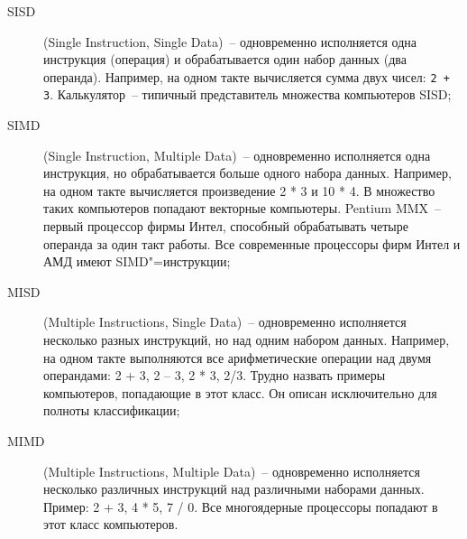 \documentclass[14pt, a4paper, openany, twoside, draft]{extbook} %
\begin{document}
\begin{description}
\item [SISD] (Single Instruction, Single Data)~-- одновременно исполняется одна инструкция (операция) и обрабатывается один набор данных (два операнда). Например, на одном такте вычисляется сумма двух чисел: \texttt{2 + 3}. Калькулятор~-- типичный представитель множества компьютеров SISD;
\item [SIMD] (Single Instruction, Multiple Data)~-- одновременно исполняется одна инструкция, но обрабатывается больше одного набора данных. Например, на одном такте вычисляется произведение 2 * 3 и 10 * 4. В множество таких компьютеров попадают векторные компьютеры. Pentium MMX~-- первый процессор фирмы Интел, способный обрабатывать четыре операнда за один такт работы. Все современные процессоры фирм Интел и АМД имеют SIMD"=инструкции;
\item [MISD] (Multiple Instructions, Single Data)~-- одновременно исполняется несколько разных инструкций, но над одним набором данных. Например, на одном такте выполняются все арифметические операции над двумя операндами: 2 + 3, 2 – 3, 2 * 3, 2/3. Трудно назвать примеры компьютеров, попадающие в этот класс. Он описан исключительно для полноты классификации;
\item [MIMD] (Multiple Instructions, Multiple Data)~-- одновременно исполняется несколько различных инструкций над различными наборами данных. Пример: 2 + 3, 4 * 5, 7 / 0. Все многоядерные процессоры попадают в этот класс компьютеров.
\end{description}
\end{document}
